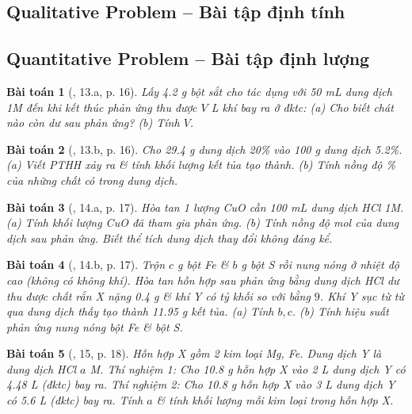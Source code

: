 \documentclass{article}
\newtheorem{baitoan}{Bài toán}
\begin{document}
\subsection{Qualitative Problem -- Bài tập định tính}

\subsection{Quantitative Problem -- Bài tập định lượng}

\begin{baitoan}[\cite{An_350_BT_Hoa_Hoc_9}, 13.a, p. 16]
	Lấy \emph{4.2 g} bột sắt cho tác dụng với \emph{50 mL} dung dịch \emph{ 1M} đến khi kết thúc phản ứng thu được $V$ \emph{L} khí \emph{} bay ra ở đktc: (a) Cho biết chát nào còn dư sau phản ứng? (b) Tính $V$.
\end{baitoan}

\begin{baitoan}[\cite{An_350_BT_Hoa_Hoc_9}, 13.b, p. 16]
	Cho \emph{29.4 g} dung dịch \emph{ 20\%} vào \emph{100 g} dung dịch \emph{ 5.2\%}. (a) Viết PTHH xảy ra \& tính khối lượng kết tủa tạo thành. (b) Tính nồng độ \% của những chất có trong dung dịch.
\end{baitoan}

\begin{baitoan}[\cite{An_350_BT_Hoa_Hoc_9}, 14.a, p. 17]
	Hòa tan 1 lượng \emph{CuO} cần \emph{100 mL} dung dịch \emph{HCl 1M}. (a) Tính khối lượng \emph{CuO} đã tham gia phản ứng. (b) Tính nồng độ mol của dung dịch sau phản ứng. Biết thể tích dung dịch thay đổi không đáng kể.
\end{baitoan}

\begin{baitoan}[\cite{An_350_BT_Hoa_Hoc_9}, 14.b, p. 17]
	Trộn $c$ \emph{g} bột \emph{Fe} \& $b$ \emph{g} bột \emph{S} rồi nung nóng ở nhiệt độ cao (không có không khí). Hòa tan hỗn hợp sau phản ứng bằng dung dịch \emph{HCl} dư thu được chất rắn X nặng \emph{0.4 g} \& khí Y có tỷ khối so với \emph{} bằng $9$. Khí Y sục từ từ qua dung dịch \emph{} thấy tạo thành \emph{11.95 g} kết tủa. (a) Tính $b,c$. (b) Tính hiệu suất phản ứng nung nóng bột \emph{Fe} \& bột \emph{S}.
\end{baitoan}

\begin{baitoan}[\cite{An_350_BT_Hoa_Hoc_9}, 15, p. 18]
	Hỗn hợp X gồm 2 kim loại \emph{Mg, Fe}. Dung dịch Y là dung dịch \emph{HCl $a$ M}. Thí nghiệm 1: Cho \emph{10.8 g} hỗn hợp X vào \emph{2 L} dung dịch Y có \emph{4.48 L } (đktc) bay ra. Thí nghiệm 2: Cho \emph{10.8 g} hỗn hợp X vào \emph{3 L} dung dịch Y có \emph{5.6 L } (đktc) bay ra. Tính $a$ \& tính khối lượng mỗi kim loại trong hỗn hợp X.
\end{baitoan}
\end{document}
